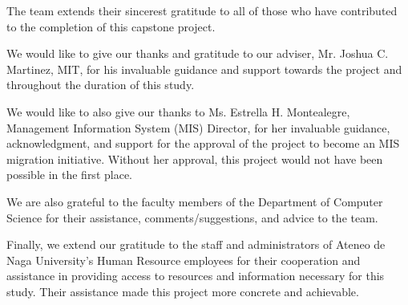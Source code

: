 \begin{acknowledgements}

The team extends their sincerest gratitude to all of those who have contributed to the completion of this capstone project.

We would like to give our thanks and gratitude to our adviser, Mr. Joshua C. Martinez, MIT, for his invaluable guidance and support towards the project and throughout the duration of this study. 

We would like to also give our thanks to Ms. Estrella H. Montealegre, Management Information System (MIS) Director, for her invaluable guidance, acknowledgment, and support for the approval of the project to become an MIS migration initiative. Without her approval, this project would not have been possible in the first place. 

We are also grateful to the faculty members of the Department of Computer Science for their assistance, comments/suggestions, and advice to the team.

Finally, we extend our gratitude to the staff and administrators of Ateneo de Naga University's Human Resource employees for their cooperation and assistance in providing access to resources and information necessary for this study. Their assistance made this project more concrete and achievable. 

\end{acknowledgements}
